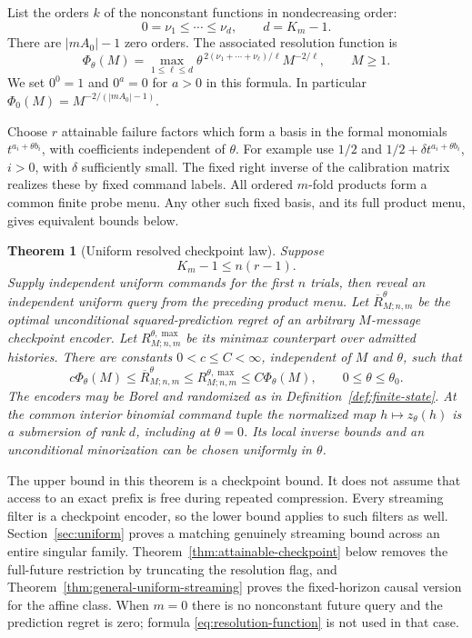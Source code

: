 \documentclass[11pt]{amsart}
\newtheorem{theorem}{Theorem}[section]
\theoremstyle{definition}\newtheorem{definition}[theorem]{Definition}
\theoremstyle{remark}\newtheorem{remark}[theorem]{Remark}
\begin{document}
List the orders $k$ of the nonconstant functions in nondecreasing order:
\[
 0=\nu_1\le\cdots\le\nu_d,\qquad d=K_m-1.
\]
There are $|mA_0|-1$ zero orders. The associated resolution function is
\begin{equation}\label{eq:resolution-function}
 \Phi_\theta(M)=\max_{1\le\ell\le d}
       \theta^{\,2(\nu_1+\cdots+\nu_\ell)/\ell}M^{-2/\ell},
       \qquad M\ge1.
\end{equation}
We set $0^0=1$ and $0^a=0$ for $a>0$ in this formula. In particular
$\Phi_0(M)=M^{-2/(|mA_0|-1)}$.

Choose $r$ attainable failure factors which form a basis in the formal
monomials $t^{a_i+\theta b_i}$, with coefficients independent of $\theta$.
For example use $1/2$ and $1/2+\delta t^{a_i+\theta b_i}$, $i>0$,
with $\delta$ sufficiently small. The fixed right inverse of the
calibration matrix realizes these by fixed command labels. All ordered
$m$-fold products form a common finite probe menu. Any other such fixed
basis, and its full product menu, gives equivalent bounds below.

\begin{theorem}[Uniform resolved checkpoint law]\label{thm:confluent-law}
Suppose
\begin{equation}\label{eq:full-future-condition}
 K_m-1\le n(r-1).
\end{equation}
Supply independent uniform commands for the first $n$ trials, then reveal
an independent uniform query from the preceding product menu. Let
$\overline R_{M;n,m}^\theta$ be the optimal unconditional squared-prediction
regret of an arbitrary $M$-message checkpoint encoder. Let
$R_{M;n,m}^{\theta,\max}$ be its minimax counterpart over admitted histories.
There are constants $0<c\le C<\infty$, independent of $M$ and $\theta$,
such that
\begin{equation}\label{eq:confluent-law}
 c\Phi_\theta(M)\le\overline R_{M;n,m}^\theta
       \le R_{M;n,m}^{\theta,\max}\le C\Phi_\theta(M),
 \qquad 0\le\theta\le\theta_0.
\end{equation}
The encoders may be Borel and randomized as in
Definition~\ref{def:finite-state}. At the common interior binomial command
tuple the normalized map $h\mapsto z_\theta(h)$ is a submersion of rank
$d$, including at $\theta=0$. Its local inverse bounds and an unconditional
minorization can be chosen uniformly in $\theta$.
\end{theorem}

The upper bound in this theorem is a checkpoint bound. It does not assume
that access to an exact prefix is free during repeated compression. Every
streaming filter is a checkpoint encoder, so the lower bound applies to
such filters as well. Section~\ref{sec:uniform} proves a matching genuinely
streaming bound across an entire singular family. Theorem~\ref{thm:attainable-checkpoint}
below removes the full-future restriction by truncating the resolution flag,
and Theorem~\ref{thm:general-uniform-streaming} proves the fixed-horizon
causal version for the affine class. When $m=0$ there is no nonconstant
future query and the prediction regret is zero; formula
\eqref{eq:resolution-function} is not used in that case.
\end{document}
